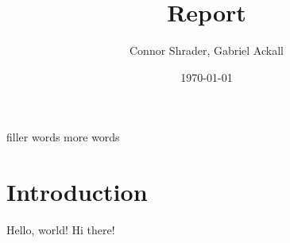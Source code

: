 \documentclass{article}
\title{Report}
\author{Connor Shrader, Gabriel Ackall}
\date{\today}
\begin{document}
filler words more words

\maketitle

\section{Introduction}
Hello, world! Hi there!
\end{document}
